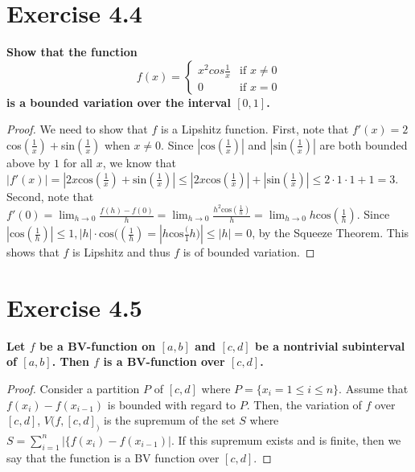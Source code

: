 \documentclass[paper=a4, fontsize=11pt]{scrartcl} %
\begin{document}
\section*{Exercise 4.4}
\boldmath
\textbf{Show that the function $$
f(x) =
\begin{cases}
x^2 cos \frac{1}{x}   & \text{if } x \neq 0 \\
0 & \text{if } x = 0
\end{cases}
$$
is a bounded variation over the interval $[0, 1]$.}
\unboldmath
\begin{proof}
We need to show that $f$ is a Lipshitz function.  First, note that $f'(x) = 2$cos$(\frac{1}{x}) + $sin$(\frac{1}{x})$ when $x \neq 0.$  Since $\left| \text{cos} (\frac{1}{x}) \right| $
and $ \left| \text{sin} (\frac{1}{x}) \right|$ are both bounded above by $1$ for all $x$, we know that $\left| f'(x) \right| = \left| 2x \text{cos} (\frac{1}{x}) + \text{sin}(\frac{1}{x}) \right| \leq \left|2x \text{cos}(\frac{1}{x})\right| + \left|\text{sin}(\frac{1}{x}) \right| \leq 2 \cdot 1 \cdot 1 + 1 = 3$.
\newline
Second, note that $f'(0) = \lim_{h \rightarrow 0} \frac{f(h) - f(0)}{h} = \lim_{h \rightarrow 0} \frac{{h^2}\text{cos}(\frac{1}{h})}{h} = \lim_{h \rightarrow 0} h \text{cos}(\frac{1}{h}).$ 
\newline
Since $|\text{cos}(\frac{1}{h})| \leq 1, |h|\cdot\text{cos}((\frac{1}{h}) = |h\text{cos}\frac({1}{h})| \leq |h| = 0$, by the Squeeze Theorem.  This shows that $f$ is Lipshitz and thus $f$ is of bounded variation.

\end{proof}


\section*{Exercise 4.5}
\boldmath
\textbf{Let $f$ be a BV-function on $[a, b]$ and $[c, d]$ be a nontrivial subinterval of $[a, b]$.  Then $f$ is a BV-function over $[c, d]$.}
\unboldmath
\begin{proof}
Consider a partition $P$ of $[c, d]$ where $P = \{x_i = 1 \leq i \leq n \}.$  Assume that $f(x_i) - f(x_{i-1})$ is bounded with regard to $P$.  Then, the variation of $f$ over $[c, d]$, $V(f, [c, d]_)$ is the supremum of the set $S$ where $S = \sum_{i = 1}^{n} | \{f(x_i) - f(x_{i-1}) |$.  If this supremum exists and is finite, then we say that the function is a BV function over $[c, d].$
\end{proof}
\end{document}
